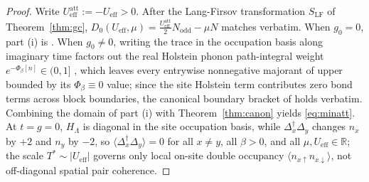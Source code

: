 \documentclass[11pt]{article}
\theoremstyle{definition}
\theoremstyle{remark}
\newcommand{\R}{\mathbb{R}}
\newcommand{\eff}{\mathrm{eff}}
\newcommand{\Ueff}{U_{\eff}}
\begin{document}
\begin{proof}
Write $\Ueff^{\mathrm{att}}:=-\Ueff>0$. After the Lang-Firsov transformation
$S_{\mathrm{LF}}$ of Theorem~\ref{thm:gc}, $D_0(\Ueff,\mu)=\frac{\Ueff^{\mathrm{att}}}{2}
N_{\mathrm{odd}}-\mu N$ matches \cite{sshbond3} verbatim. When $g_0=0$, part (i)
is \cite{sshbond3}. When $g_0\ne0$, writing the trace in the occupation basis along
imaginary time factors out the real Holstein phonon path-integral weight
$e^{-\Phi_\beta[n]}\in(0,1]$ \cite{stage6}, which leaves every entrywise
nonnegative majorant of \cite{sshbond3} upper bounded by its $\Phi_\beta\equiv0$
value; since the site Holstein term contributes zero bond terms across block
boundaries, the canonical boundary bracket of \cite{sshbond3} holds verbatim.
Combining the domain of part (i) with Theorem~\ref{thm:canon} yields
\eqref{eq:minatt}. At $t=g=0$, $H_\Lambda$ is diagonal in the site occupation basis,
while $\Delta_x^\dagger\Delta_y$ changes $n_x$ by $+2$ and $n_y$ by $-2$, so
$\langle\Delta_x^\dagger\Delta_y\rangle=0$ for all $x\ne y$, all $\beta>0$, and all
$\mu,\Ueff\in\R$; the scale $T^*\sim|\Ueff|$ governs only local on-site double
occupancy $\langle n_{x\uparrow}n_{x\downarrow}\rangle$, not off-diagonal spatial
pair coherence.
\end{proof}
\end{document}
